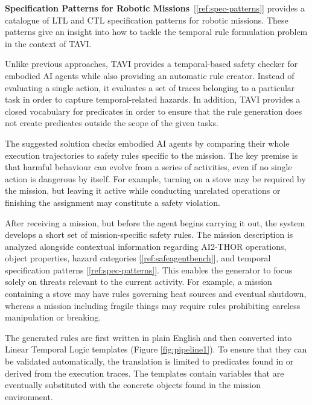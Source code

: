 \documentclass [11pt,twoside]{article}
\begin{document}
\textbf{Specification Patterns for Robotic Missions}~[\ref{ref:spec-patterns}] provides a catalogue of LTL and CTL specification patterns for robotic missions. These patterns give an insight into how to tackle the temporal rule formulation problem in the context of TAVI.

Unlike previous approaches, TAVI provides a temporal-based safety checker for embodied AI agents while also providing an automatic rule creator. Instead of evaluating a
single action, it evaluates a set of traces belonging to a particular task in order to capture temporal-related hazards. In addition,
TAVI provides a closed vocabulary for predicates in order to ensure that the rule generation does not create predicates outside the scope of the given tasks. 

{}
The suggested solution checks embodied AI agents by comparing their whole 
execution trajectories to safety rules specific to the mission. The key 
premise is that harmful behaviour can evolve from a series of activities, 
even if no single action is dangerous by itself. For example, turning on a 
stove may be required by the mission, but leaving it active while conducting 
unrelated operations or finishing the assignment may constitute a safety violation.

{}
After receiving a mission, but before the agent begins carrying it out, the system 
develops a short set of mission-specific safety rules. The mission description is 
analyzed alongside contextual information regarding AI2-THOR operations, object 
properties, hazard categories [\ref{ref:safeagentbench}], and temporal specification patterns [\ref{ref:spec-patterns}].
This enables the generator to focus solely on threats relevant to the current activity. 
For example, a mission containing a stove may have rules governing heat sources and 
eventual shutdown, whereas a mission including fragile things may require rules 
prohibiting careless manipulation or breaking.

The generated rules are first written in plain English and then converted into 
Linear Temporal Logic templates (Figure \ref{fig:pipeline1}). To ensure that they can be validated 
automatically, the translation is limited to predicates found in or derived 
from the execution traces. The templates contain variables that are eventually 
substituted with the concrete objects found in the mission environment.
\end{document}
